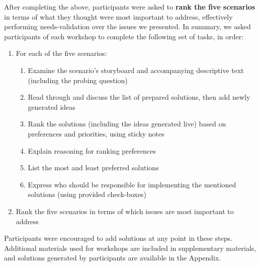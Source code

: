 After completing the above, participants were asked to \textbf{rank the five scenarios} in terms of what they thought were most important to address, effectively performing needs-validation over the issues we presented. In summary, we asked participants of each workshop to complete the following set of tasks, in order: 
\begin{enumerate}
    \item {For each of the five scenarios:}
    \begin{enumerate}
        \item {Examine the scenario's storyboard and accompanying descriptive text (including the probing question)}
        \item Read through and discuss the list of prepared solutions, then add newly generated ideas
        \item {Rank the solutions (including the ideas generated live) based on preferences and priorities, using sticky notes}
        \item {Explain reasoning for ranking preferences}
        \item {List the most and least preferred solutions}
        \item {Express who should be responsible for implementing the mentioned solutions (using provided check-boxes)}
    \end{enumerate}
    \item {Rank the five scenarios in terms of which issues are most important to address}
\end{enumerate}
Participants were encouraged to add solutions at any point in these steps. Additional materials used for workshops are included in supplementary materials, and solutions generated by participants are available in the Appendix. 

